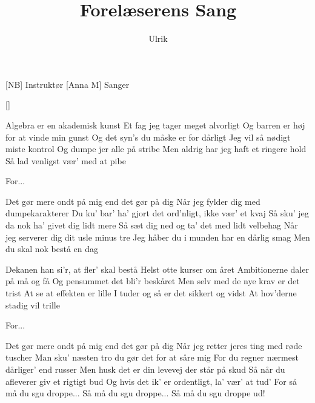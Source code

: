 \documentclass[a4paper,11pt]{article}
\title{Forelæserens Sang}
\author{Ulrik}
\begin{document}
\maketitle

\begin{roles}
[NB] Instruktør
[Anna M] Sanger
\end{roles}

\begin{props}
[]
\end{props}

\begin{song}
 Algebra er en akademisk kunst
Et fag jeg tager meget alvorligt
Og barren er høj for at vinde min gunst
Og det syn's du måske er for dårligt
Jeg vil så nødigt miste kontrol
Og dumpe jer alle på stribe
Men aldrig har jeg haft et ringere hold
Så lad venligst vær' med at pibe

For...

Det gør mere ondt på mig end det gør på dig
Når jeg fylder dig med dumpekarakterer
Du ku' bar' ha' gjort det ord'nligt, ikke vær' et kvaj
Så sku' jeg da nok ha' givet dig lidt mere
Så sæt dig ned og ta' det med lidt velbehag
Når jeg serverer dig dit usle minus tre
Jeg håber du i munden har en dårlig smag
Men du skal nok bestå en dag

Dekanen han si'r, at fler' skal bestå
Helst otte kurser om året
Ambitionerne daler på må og få
Og pensummet det bli'r beskåret
Men selv med de nye krav er det trist
At se at effekten er lille
I tuder og så er det sikkert og vidst
At hov'derne stadig vil trille

For...

Det gør mere ondt på mig end det gør på dig
Når jeg retter jeres ting med røde tuscher
Man sku' næsten tro du gør det for at såre mig
For du regner nærmest dårliger' end russer
Men husk det er din levevej der står på skud
Så når du afleverer giv et rigtigt bud
Og hvis det ik' er ordentligt, la' vær' at tud'
For så må du sgu droppe...
Så må du sgu droppe...
Så må du sgu droppe ud!
\end{song}
\end{document}
